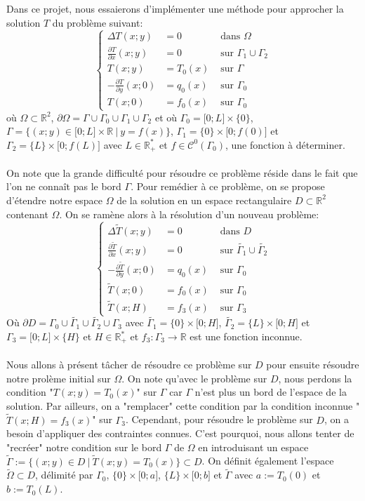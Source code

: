 \documentclass{article}
\begin{document}
Dans ce projet, nous essaierons d'implémenter une méthode pour approcher la solution $T$ du problème suivant:
\[
\left \{
\begin{align*}
    \Delta T(x;y)&=0&\text{    dans }\Omega\\
    \frac{\partial T}{\partial x}(x;y)&=0&\text{   sur }\Gamma_1\cup\Gamma_2\\
    T(x;y)&=T_0(x)&\text{   sur }\Gamma\\
    -\frac{\partial T}{\partial y}(x;0)&=q_0(x)&\text{   sur }\Gamma_0\\
    T(x;0)&=f_0(x)&\text{   sur }\Gamma_0
\end{align*}
\]
où $\Omega\subset\mathbb{R}^2$, $\partial\Omega =\Gamma\cup\Gamma_0\cup\Gamma_1\cup\Gamma_2$ et où $\Gamma_0 =\lbrack 0;L\rbrack\times\{ 0\}$, $\Gamma =\{(x;y)\in\lbrack 0;L\rbrack\times\mathbb{R}\ \lvert \ y=f(x)\}$, $\Gamma_1=\{ 0\}\times\lbrack 0;f(0)\rbrack$ et $\Gamma_2=\{ L\}\times\lbrack 0;f(L)\rbrack$ avec $L\in\mathbb{R}_+^*$ et $f\in\mathcal{C}^0(\Gamma_0)$, une fonction à déterminer.
\\
\\
On note que la grande difficulté pour résoudre ce problème réside dans le fait que l'on ne connaît pas le bord $\Gamma$. Pour remédier à ce problème, on se propose d'étendre notre espace $\Omega$ de la solution en un espace rectangulaire $D\subset\mathbb{R}^2$ contenant $\Omega$. On se ramène alors à la résolution d'un nouveau problème:
\[
\left \{
\begin{align*}
    \Delta\tilde{T}(x;y)&=0&\text{    dans }D\\
    \frac{\partial\tilde{T}}{\partial x}(x;y)&=0&\text{   sur }\tilde{\Gamma_1}\cup\tilde{\Gamma_2}\\
    -\frac{\partial\tilde{T}}{\partial y}(x;0)&=q_0(x)&\text{   sur }\Gamma_0\\
    \tilde{T}(x;0)&=f_0(x)&\text{   sur }\Gamma_0\\
    \tilde{T}(x;H)&=f_3(x)&\text{   sur }\Gamma_3
\end{align}
\]
Où $\partial D=\Gamma_0\cup\tilde{\Gamma_1}\cup\tilde{\Gamma_2}\cup\Gamma_3$ avec $\tilde{\Gamma_1}=\{ 0\}\times\lbrack 0;H\rbrack$, $\tilde{\Gamma_2}=\{ L\}\times\lbrack 0;H\rbrack$ et $\Gamma_3=\lbrack 0;L\rbrack\times\{ H\}$ et $H\in\mathbb{R}_+^*$ et $f_3:\Gamma_3\to\mathbb{R}$ est une fonction inconnue.
\\
\\
Nous allons à présent tâcher de résoudre ce problème sur $D$ pour ensuite résoudre notre prolème initial sur $\Omega$. On note qu'avec le problème sur $D$, nous perdons la condition "$T(x;y)=T_0(x)$" sur $\Gamma$ car $\Gamma$ n'est plus un bord de l'espace de la solution. Par ailleurs, on a "remplacer" cette condition par la condition inconnue "$\tilde{T}(x;H)=f_3(x)$" sur $\Gamma_3$. Cependant, pour résoudre le problème sur $D$, on a besoin d'appliquer des contraintes connues. C'est pourquoi, nous allons tenter de "recréer" notre condition sur le bord $\Gamma$ de $\Omega$ en introduisant un espace $\tilde{\Gamma}:=\{ (x;y)\in D \ | \ \tilde{T}(x;y)=T_0(x)\}\subset D$. On définit également l'espace $\tilde{\Omega}\subset D$, délimité par $\Gamma_0$, $\{ 0\}\times\lbrack 0;a\rbrack$, $\{ L\}\times\lbrack 0;b\rbrack$ et $\tilde{\Gamma}$ avec $a:=T_0(0)$ et $b:=T_0(L)$.
\end{document}
